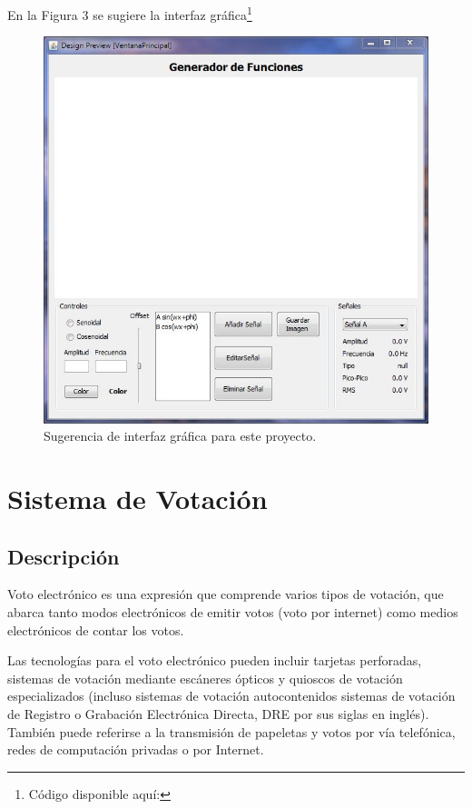 \documentclass[11pt]{article}
\begin{document}
En la Figura 3 se sugiere la interfaz gráfica\footnote{Código disponible aquí: }

\begin{figure}[h]
\centering
\includegraphics[scale=0.5]{pics/img_1.JPG} 
\caption{Sugerencia de interfaz gráfica para este proyecto.}
\end{figure}



\section{Sistema de Votación}
\subsection{Descripción}
Voto electrónico es una expresión que comprende varios tipos de votación, que abarca tanto modos electrónicos de emitir votos (voto por internet) como medios electrónicos de contar los votos.

Las tecnologías para el voto electrónico pueden incluir tarjetas perforadas, sistemas de votación mediante escáneres ópticos y quioscos de votación especializados (incluso sistemas de votación autocontenidos sistemas de votación de Registro o Grabación Electrónica Directa, DRE por sus siglas en inglés). También puede referirse a la transmisión de papeletas y votos por vía telefónica, redes de computación privadas o por Internet.
\end{document}
